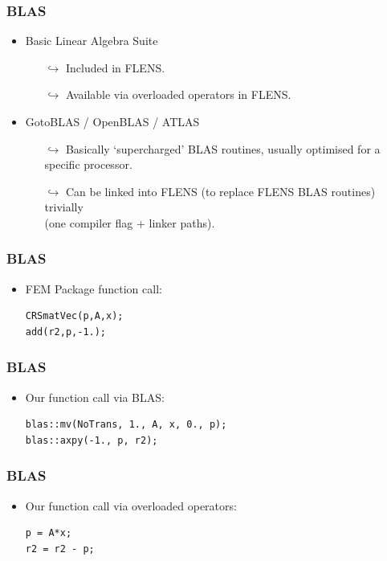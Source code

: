 \documentclass[10pt, a4paper, mathserif]{beamer} %
\newcommand{\<}{$\langle$}
\newcommand{\>}{$\rangle$}
\begin{document}
\begin{frame}[fragile]
\frametitle{BLAS}
\begin{itemize}
	\item <2-> Basic Linear Algebra Suite
	\vspace{0.3cm}
	\begin{itemize}
		\item[$\hookrightarrow$] Included in FLENS.
		\vspace{0.3cm}
		\item[$\hookrightarrow$] Available via overloaded operators in FLENS.
	\end{itemize}
	\vspace{0.3cm}
	\item <3-> GotoBLAS / OpenBLAS / ATLAS
	\vspace{0.3cm}
	\begin{itemize}
		\item[$\hookrightarrow$] Basically `supercharged' BLAS routines, usually optimised for a specific processor.
		\vspace{0.3cm}
		\item[$\hookrightarrow$] Can be linked into FLENS (to replace FLENS BLAS routines) trivially\\ (one compiler flag + linker paths).
	\end{itemize}
\end{itemize}
\end{frame}

\begin{frame}[fragile]
\frametitle{BLAS}
\begin{itemize}
	\item <1-> FEM Package function call:
	\begin{lstlisting}
CRSmatVec(p,A,x);
add(r2,p,-1.);
	\end{lstlisting}
\end{itemize}
\end{frame}

\begin{frame}[fragile]
\frametitle{BLAS}
\begin{itemize}
	\item <1-> Our function call via BLAS:
	\begin{lstlisting}
blas::mv(NoTrans, 1., A, x, 0., p); 
blas::axpy(-1., p, r2);
	\end{lstlisting}
\end{itemize}
\end{frame}

\begin{frame}[fragile]
\frametitle{BLAS}
\begin{itemize}
	\item <1-> Our function call via overloaded operators:
	\begin{lstlisting}
p = A*x;
r2 = r2 - p;
	\end{lstlisting}
\end{itemize}
\end{frame}
\end{document}
